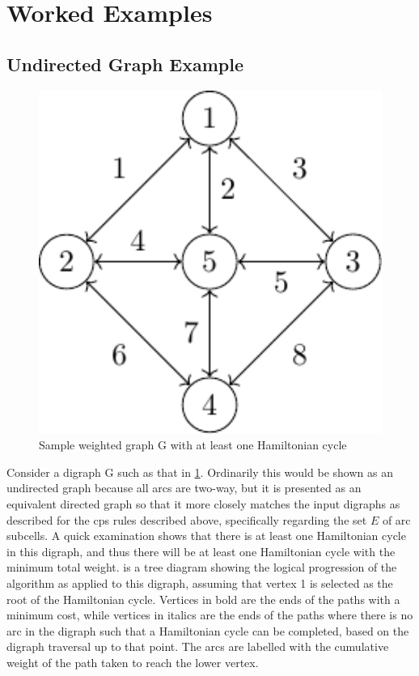 \section{\label{sec:tsp:example}Worked Examples}

\subsection{Undirected Graph Example}

\begin{figure}
\centering
\includegraphics[keepaspectratio,width=1.0\textwidth,height=0.42\textheight]{chapters/tsp/figs/ugraph-figure0}
\caption{\label{fig:tsp:ugraph}Sample weighted graph G with at least one Hamiltonian cycle}
\end{figure}

Consider a digraph G such as that in \cref{fig:tsp:ugraph}.  Ordinarily this would be shown as an undirected graph because all arcs are two-way, but it is presented as an equivalent directed graph so that it more closely matches the input digraphs as described for the \gls{cps} rules described above, specifically regarding the set \(E\) of arc subcells.  A quick examination shows that there is at least one Hamiltonian cycle in this digraph, and thus there will be at least one Hamiltonian cycle with the minimum total weight.   is a tree diagram showing the logical progression of the algorithm as applied to this digraph, assuming that vertex 1 is selected as the root of the Hamiltonian cycle.  Vertices in bold are the ends of the paths with a minimum cost, while vertices in italics are the ends of the paths where there is no arc in the digraph such that a Hamiltonian cycle can be completed, based on the digraph traversal up to that point.  The arcs are labelled with the cumulative weight of the path taken to reach the lower vertex.

